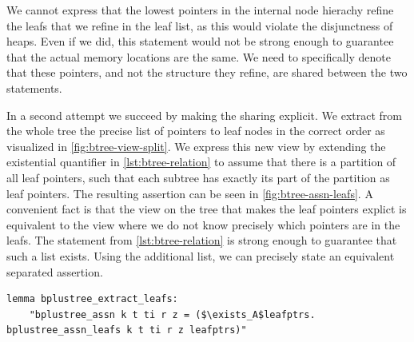 \documentclass[a4paper,UKenglish,cleveref, autoref, thm-restate]{lipics-v2021}
\begin{document}

We cannot express that the lowest pointers
in the internal node hierachy refine the leafs
that we refine in the leaf list,
as this would violate the disjunctness of heaps.
Even if we did, this statement would not be strong enough
to guarantee that the actual memory locations
are the same.
We need to specifically denote that these pointers,
and not the structure they refine,
are shared between the two statements.

In a second attempt we succeed by making the sharing explicit.
We extract from the whole tree the precise list of pointers to leaf nodes
in the correct order as visualized in \autoref{fig:btree-view-split}.
We express this new view by extending the existential quantifier in \autoref{lst:btree-relation}
to assume that there is a partition of all leaf pointers,
such that each subtree has exactly its part of the partition as leaf pointers.
The resulting assertion can be seen in \autoref{fig:btree-assn-leafs}.
A convenient fact is that the view on the tree that makes the leaf pointers explict
is equivalent to the view where we do not know precisely which pointers are in the leafs.
The statement from \autoref{lst:btree-relation} is strong enough to guarantee that such a list exists.
Using the additional list, we can precisely state an equivalent
separated assertion.

\begin{lstlisting}[mathescape=true, language=Isabelle,label=lst:btree-extract-leafs]
lemma bplustree_extract_leafs:
    "bplustree_assn k t ti r z = ($\exists_A$leafptrs. bplustree_assn_leafs k t ti r z leafptrs)"
\end{lstlisting}
\end{document}
